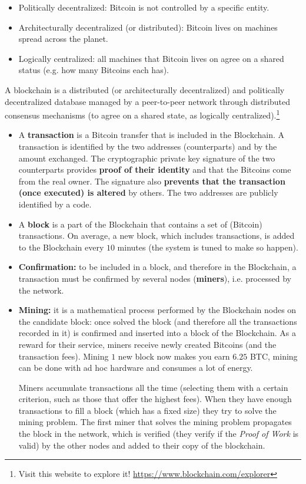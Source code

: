 \begin{itemize}
	\item Politically decentralized: Bitcoin is not controlled by a specific entity.
	\item Architecturally decentralized (or distributed): Bitcoin lives on machines spread across the planet.
	\item Logically centralized: all machines that Bitcoin lives on agree on a shared status (e.g. how many Bitcoins each has).
\end{itemize}

A blockchain is a distributed (or architecturally decentralized) and politically decentralized database managed by a peer-to-peer network through distributed consensus mechanisms (to agree on a shared state, as logically centralized).\footnote{Visit this website to explore it! \url{https://www.blockchain.com/explorer}}
\begin{itemize}
	\item A \textbf{transaction} is a Bitcoin transfer that is included in the Blockchain. A transaction is identified by the two addresses (counterparts) and by the amount exchanged. The cryptographic private key signature of the two counterparts provides \textbf{proof of their identity} and that the Bitcoins come from the real owner. The signature also \textbf{prevents that the transaction (once executed) is altered} by others. The two addresses are publicly identified by a code.
\end{itemize}


\begin{itemize}
	\item A \textbf{block} is a part of the Blockchain that contains a set of (Bitcoin) transactions. On average, a new block, which includes transactions, is added to the Blockchain every $10$ minutes (the system is tuned to make so happen).
	\item \textbf{Confirmation:} to be included in a block, and therefore in the Blockchain, a transaction must be confirmed by several nodes (\textbf{miners}), i.e. processed by the network.
	\item \textbf{Mining:} it is a mathematical process performed by the Blockchain nodes on the candidate block: once solved the block (and therefore all the transactions recorded in it) is confirmed and inserted into a block of the Blockchain. As a reward for their service, miners receive newly created Bitcoins (and the transaction fees). Mining $1$ new block now makes you earn $6.25$ BTC, mining can be done with ad hoc hardware and consumes a lot of energy.
	      
	      Miners accumulate transactions all the time (selecting them with a certain criterion, such as those that offer the highest fees). When they have enough transactions to fill a block (which has a fixed size) they try to solve the mining problem. The first miner that solves the mining problem propagates the block in the network, which is verified (they verify if the \textit{Proof of Work} is valid) by the other nodes and added to their copy of the blockchain.
\end{itemize}

